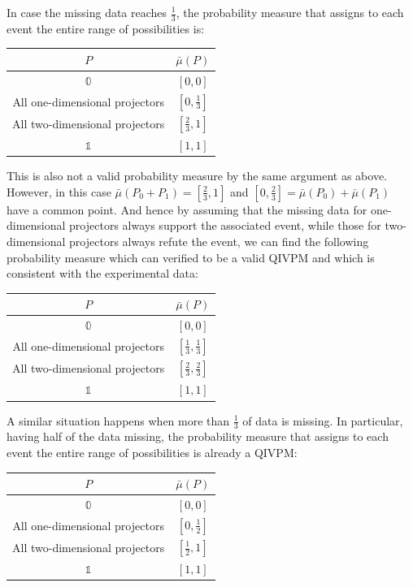 \documentclass[english,reprint, aps, prl,superscriptaddress, showpacs,
showkeys, longbibliography, amsmath, amssymb, floatfix]{revtex4-1}
\theoremstyle{plain}
\theoremstyle{definition}
\newcommand{\imposs}{\ensuremath{\left[0,0\right]}}
\newcommand{\necess}{\ensuremath{\left[1,1\right]}}
\begin{document}
In case the missing data reaches $\frac{1}{3}$, the probability
measure that assigns to each event the entire range of possibilities
is:
\begin{center}
\begin{tabular}{cc}
\toprule 
\addlinespace
$P$  & $\bar{\mu}\left(P\right)$\tabularnewline
\midrule
\midrule 
\addlinespace
$\mathbb{0}$ & $\imposs$\tabularnewline
\midrule 
\addlinespace
All one-dimensional projectors & $\left[0,\tfrac{1}{3}\right]$\tabularnewline
\midrule 
\addlinespace
All two-dimensional projectors & $\left[\tfrac{2}{3},1\right]$\tabularnewline
\midrule 
\addlinespace
$\mathbb{1}$ & $\necess$\tabularnewline
\bottomrule
\end{tabular}
\par\end{center}

\noindent This is also not a valid probability measure by the same
argument as above. However, in this case
$\bar{\mu}\left(P_{0}+P_{1}\right)=\left[\tfrac{2}{3},1\right]$ and
$\left[0,\tfrac{2}{3}\right]=\bar{\mu}\left(P_{0}\right)+\bar{\mu}\left(P_{1}\right)$
have a common point. And hence by assuming that the missing data for
one-dimensional projectors always support the associated event, while
those for two-dimensional projectors always refute the event, we can
find the following probability measure which can verified to be a
valid QIVPM and which is consistent with the experimental data:
\begin{center}
\begin{tabular}{cc}
\toprule 
\addlinespace
$P$  & $\bar{\mu}\left(P\right)$\tabularnewline
\midrule
\midrule 
\addlinespace
$\mathbb{0}$ & $\imposs$\tabularnewline
\midrule 
\addlinespace
All one-dimensional projectors & $\left[\tfrac{1}{3},\tfrac{1}{3}\right]$\tabularnewline
\midrule 
\addlinespace
All two-dimensional projectors & $\left[\tfrac{2}{3},\tfrac{2}{3}\right]$\tabularnewline
\midrule 
\addlinespace
$\mathbb{1}$ & $\necess$\tabularnewline
\bottomrule
\end{tabular}
\par\end{center}

A similar situation happens when more than $\frac{1}{3}$ of data is
missing. In particular, having half of the data missing, the
probability measure that assigns to each event the entire range of
possibilities is already a QIVPM:

\begin{center}
\begin{tabular}{cc}
\toprule 
\addlinespace
$P$  & $\bar{\mu}\left(P\right)$\tabularnewline
\midrule
\midrule 
\addlinespace
$\mathbb{0}$ & $\imposs$\tabularnewline
\midrule 
\addlinespace
All one-dimensional projectors & $\left[0,\tfrac{1}{2}\right]$\tabularnewline
\midrule 
\addlinespace
All two-dimensional projectors & $\left[\tfrac{1}{2},1\right]$\tabularnewline
\midrule 
\addlinespace
$\mathbb{1}$ & $\necess$\tabularnewline
\bottomrule
\end{tabular}
\par\end{center}
\end{document}
